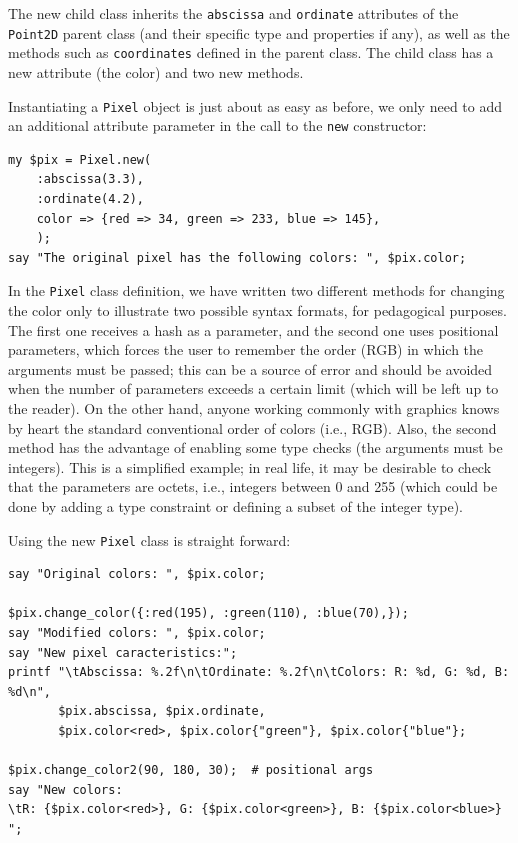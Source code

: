The new child class inherits the {\tt abscissa} and 
{\tt ordinate} attributes of the {\tt Point2D} parent 
class (and their specific type and properties if any), 
as well as the methods such as {\tt coordinates} defined 
in the parent class. The child class  has a new 
attribute (the color) and two new methods.

Instantiating a {\tt Pixel} object is just about as easy as 
before, we only need to add an additional attribute parameter 
in the call to the {\tt new} constructor:

\begin{verbatim}
my $pix = Pixel.new(
    :abscissa(3.3),
    :ordinate(4.2),
    color => {red => 34, green => 233, blue => 145}, 
    );
say "The original pixel has the following colors: ", $pix.color;
\end{verbatim}

In the {\tt Pixel} class definition, we have written 
two different methods for changing the color 
only to illustrate two possible syntax formats, for pedagogical 
purposes. The first one receives a hash as a parameter, and 
the second one uses positional parameters, which forces 
the user to remember the order (RGB) in which the arguments must 
be passed; this can be a source of error and should be avoided 
when the number of parameters exceeds a certain limit 
(which will be left up to the reader). On the other 
hand, anyone working commonly with graphics knows by heart the 
standard conventional order of colors (i.e., RGB). Also, 
the second method has the 
advantage of enabling some type checks (the arguments must 
be integers). This is a simplified example; in real life, it 
may be desirable to check that the parameters are octets, i.e., 
integers between 0 and 255 (which could be done by adding a 
type constraint or defining a subset of the integer type).

Using the new {\tt Pixel} class is straight forward:

\begin{verbatim}
say "Original colors: ", $pix.color;

$pix.change_color({:red(195), :green(110), :blue(70),});
say "Modified colors: ", $pix.color;
say "New pixel caracteristics:";
printf "\tAbscissa: %.2f\n\tOrdinate: %.2f\n\tColors: R: %d, G: %d, B: %d\n",
       $pix.abscissa, $pix.ordinate, 
       $pix.color<red>, $pix.color{"green"}, $pix.color{"blue"};

$pix.change_color2(90, 180, 30);  # positional args
say "New colors:  
\tR: {$pix.color<red>}, G: {$pix.color<green>}, B: {$pix.color<blue>} ";
\end{verbatim}

